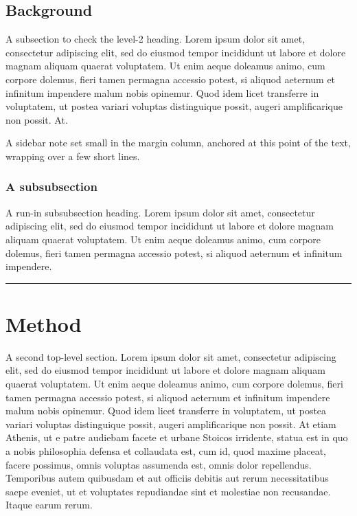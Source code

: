 \documentclass[sigchi-a]{acmart}
\begin{document}
\subsection{Background}
A subsection to check the level-2 heading. Lorem ipsum dolor sit amet,
consectetur adipiscing elit, sed do eiusmod tempor incididunt ut labore et dolore
magnam aliquam quaerat voluptatem. Ut enim aeque doleamus animo, cum corpore
dolemus, fieri tamen permagna accessio potest, si aliquod aeternum et infinitum
impendere malum nobis opinemur. Quod idem licet transferre in voluptatem, ut
postea variari voluptas distinguique possit, augeri amplificarique non possit. At.

\begin{sidebar}
A sidebar note set small in the margin column, anchored at this point of the
text, wrapping over a few short lines.
\end{sidebar}
\subsubsection{A subsubsection}
A run-in subsubsection heading. Lorem ipsum dolor sit amet, consectetur
adipiscing elit, sed do eiusmod tempor incididunt ut labore et dolore magnam
aliquam quaerat voluptatem. Ut enim aeque doleamus animo, cum corpore dolemus,
fieri tamen permagna accessio potest, si aliquod aeternum et infinitum impendere.
\begin{marginfigure}
\rule{3cm}{1cm}
\caption{A margin figure caption.}
\end{marginfigure}

\section{Method}
A second top-level section. Lorem ipsum dolor sit amet, consectetur adipiscing
elit, sed do eiusmod tempor incididunt ut labore et dolore magnam aliquam quaerat
voluptatem. Ut enim aeque doleamus animo, cum corpore dolemus, fieri tamen
permagna accessio potest, si aliquod aeternum et infinitum impendere malum nobis
opinemur. Quod idem licet transferre in voluptatem, ut postea variari voluptas
distinguique possit, augeri amplificarique non possit. At etiam Athenis, ut e
patre audiebam facete et urbane Stoicos irridente, statua est in quo a nobis
philosophia defensa et collaudata est, cum id, quod maxime placeat, facere
possimus, omnis voluptas assumenda est, omnis dolor repellendus. Temporibus autem
quibusdam et aut officiis debitis aut rerum necessitatibus saepe eveniet, ut et
voluptates repudiandae sint et molestiae non recusandae. Itaque earum rerum.
\end{document}

